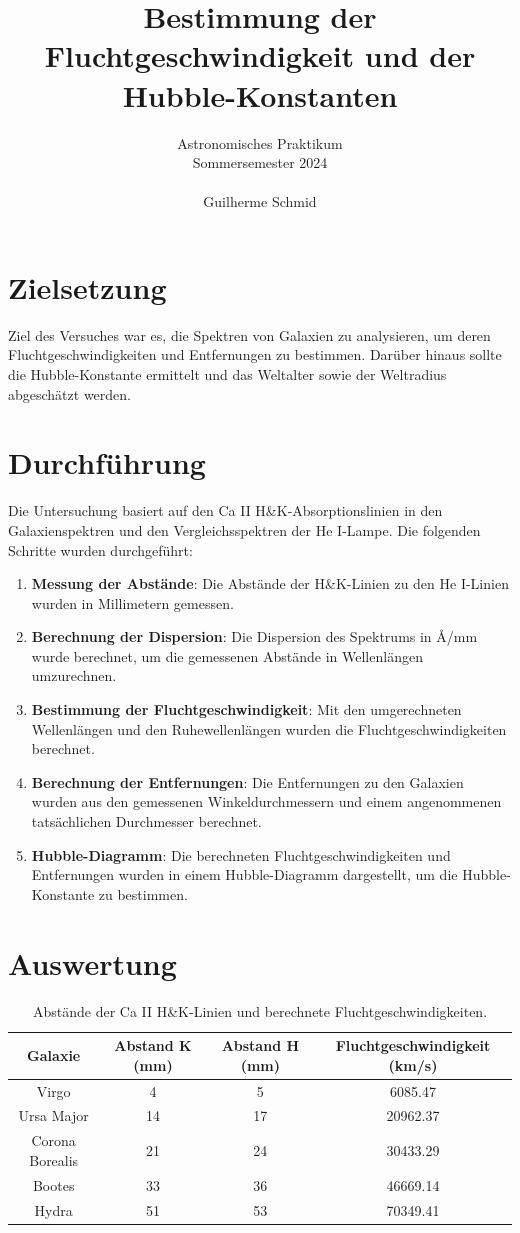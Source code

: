 \documentclass[a4paper,12pt]{article}
\title{Bestimmung der Fluchtgeschwindigkeit und der Hubble-Konstanten}
\author{Astronomisches Praktikum \\
Sommersemester 2024\\\\
Guilherme Schmid}
\date{}
\begin{document}
\maketitle

\section*{Zielsetzung}
Ziel des Versuches war es, die Spektren von Galaxien zu analysieren, um deren Fluchtgeschwindigkeiten und Entfernungen zu bestimmen. Darüber hinaus sollte die Hubble-Konstante ermittelt und das Weltalter sowie der Weltradius abgeschätzt werden.

\section*{Durchführung}
Die Untersuchung basiert auf den Ca II H\&K-Absorptionslinien in den Galaxienspektren und den Vergleichsspektren der He I-Lampe. Die folgenden Schritte wurden durchgeführt:
\begin{enumerate}
	\item \textbf{Messung der Abstände}: Die Abstände der H\&K-Linien zu den He I-Linien wurden in Millimetern gemessen.
	\item \textbf{Berechnung der Dispersion}: Die Dispersion des Spektrums in Å/mm wurde berechnet, um die gemessenen Abstände in Wellenlängen umzurechnen.
	\item \textbf{Bestimmung der Fluchtgeschwindigkeit}: Mit den umgerechneten Wellenlängen und den Ruhewellenlängen wurden die Fluchtgeschwindigkeiten berechnet.
	\item \textbf{Berechnung der Entfernungen}: Die Entfernungen zu den Galaxien wurden aus den gemessenen Winkeldurchmessern und einem angenommenen tatsächlichen Durchmesser berechnet.
	\item \textbf{Hubble-Diagramm}: Die berechneten Fluchtgeschwindigkeiten und Entfernungen wurden in einem Hubble-Diagramm dargestellt, um die Hubble-Konstante zu bestimmen.

\end{enumerate}

\section*{Auswertung}
\begin{table}[H]
    \centering
    \begin{tabular}{cccc}
        \toprule
        Galaxie & Abstand K (mm) & Abstand H (mm) & Fluchtgeschwindigkeit (km/s) \\
        \midrule
        Virgo & 4 & 5 & 6085.47 \\
        Ursa Major & 14 & 17 & 20962.37 \\
        Corona Borealis & 21 & 24 & 30433.29 \\
        Bootes & 33 & 36 & 46669.14 \\
        Hydra & 51 & 53 & 70349.41 \\
        \bottomrule
    \end{tabular}
    \caption{Abstände der Ca II H\&K-Linien und berechnete Fluchtgeschwindigkeiten.}
    \label{tab:fluchtgeschwindigkeit}
\end{table}
\end{document}
